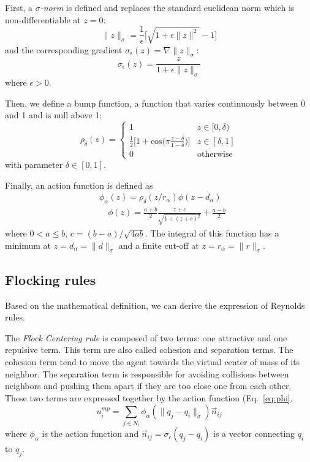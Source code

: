 First, a $\sigma$\emph{-norm} is defined and replaces the standard euclidean norm which is non-differentiable at $z=0$:
\begin{equation}
\|z\|_{\sigma}=\frac{1}{\epsilon}\big[\sqrt{1+\epsilon\|z\|^2}-1\big]
\label{eq:sigmanorm}
\end{equation}
and the corresponding gradient $\sigma_{\epsilon}(z)=\nabla\|z\|_{\sigma}$:
\begin{equation}
\sigma_{\epsilon}(z)=\frac{z}{1+\epsilon\|z\|_{\sigma}}
\label{eq:sigmagrad}
\end{equation}
where $\epsilon>0$. 

Then, we define a bump function, a function that varies continuously between 0 and 1 and is null above 1:
\begin{equation}
\rho_{\delta}(z)=
\left\lbrace
\begin{array}{lll}
1 & z\in[0,\delta)\\
\frac{1}{2}\Big[1+\text{cos}\big(\pi\frac{z-\delta}{1-\delta}\big)\Big] & z\in[\delta,1]\\
0 & \mbox{otherwise}
\end{array}\right.
\label{eq:bump}
\end{equation}
with parameter $\delta\in[0,1]$.

Finally, an action function is defined as 
\begin{align}
&\phi_{\alpha}(z)=\rho_{\delta}(z/r_{\alpha})\phi(z-d_{\alpha}) \nonumber \\
&\quad\phi(z)=\frac{a+b}{2}\frac{z+c}{\sqrt{1+(z+c)^2}}+\frac{a-b}{2}
\label{eq:phi}
\end{align}
where $0<a\le b$, $c=(b-a)/\sqrt{4ab}$. The integral of this function has a minimum at $z=d_{\alpha}=\|d\|_{\sigma}$ and a finite cut-off at $z=r_{\alpha}=\|r\|_{\sigma}$. 

\subsection{Flocking rules}

Based on the mathematical definition, we can derive the expression of Reynolds rules. 

The \emph{Flock Centering rule} is composed of two terms: one attractive and one repulsive term. This term are also called cohesion and separation terms. The cohesion term tend to move the agent towards the virtual center of mass of its neighbor. The separation term is responsible for avoiding collisions between neighbors and pushing them apart if they are too close one from each other.  These two terms are expressed together by the action function (Eq.~\ref{eq:phi}.
\begin{equation}
u_i^{mp}=\sum_{j\in N_i}{\phi_{\alpha}(\|q_j-q_i\|_{\sigma})}\vec{n}_{ij}
\label{eq:motionplanning}
\end{equation}
where $\phi_{\alpha}$ is the action function and $\vec{n}_{ij}=\sigma_{\epsilon}(q_j-q_i)$ is a vector connecting $q_i$ to $q_j$. 

